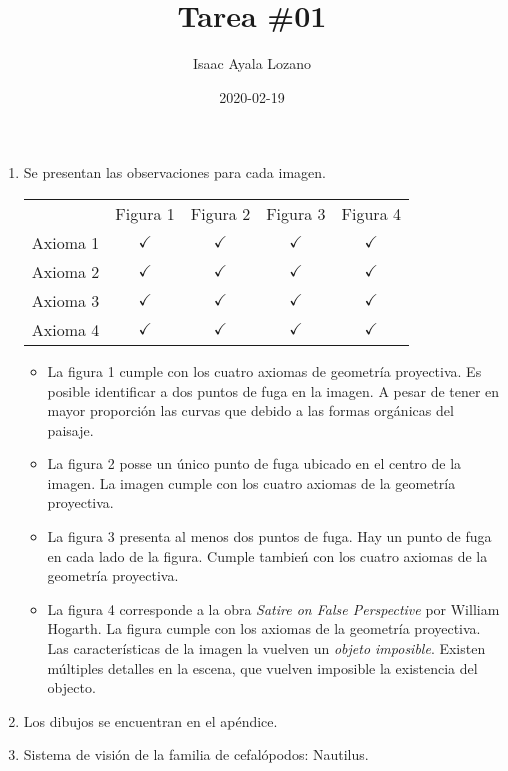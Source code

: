 \documentclass[a4paper,12pt]{article}
\title{Tarea \#01}
\author{Isaac Ayala Lozano}
\date{2020-02-19}
\begin{document}
\maketitle

\begin{enumerate}
 \item Se presentan las observaciones para cada imagen.

 \begin{table}[htb!]
  \begin{center}
\begin{tabular}{lcccc}
 & Figura 1 & Figura 2 & Figura 3 & Figura 4\\
Axioma 1 & $\checkmark$ & $\checkmark$ & $\checkmark$ & $\checkmark$\\
Axioma 2 & $\checkmark$ & $\checkmark$ & $\checkmark$ & $\checkmark$\\
Axioma 3 & $\checkmark$ & $\checkmark$ & $\checkmark$ & $\checkmark$\\
Axioma 4 & $\checkmark$ & $\checkmark$ & $\checkmark$ & $\checkmark$
  \end{tabular}
  \end{center}
 \end{table}


    \begin{itemize}
     \item La figura 1 cumple con los cuatro axiomas de geometría proyectiva.
     Es posible identificar a dos puntos de fuga en la imagen.
     A pesar de tener en mayor proporción las curvas que debido a las formas orgánicas del paisaje.
     \item La figura 2 posse un único punto de fuga ubicado en el centro de la imagen.
     La imagen cumple con los cuatro axiomas de la geometría proyectiva.
     \item La figura 3 presenta al menos dos puntos de fuga. Hay un punto de fuga en cada lado de la figura.
     Cumple tambień con los cuatro axiomas de la geometría proyectiva.
     \item La figura 4 corresponde a la obra \emph{Satire on False Perspective} por William Hogarth.
     La figura cumple con los axiomas de la geometría proyectiva.
     Las características de la imagen la vuelven un \emph{objeto imposible}.
     Existen múltiples detalles en la escena, que vuelven imposible la existencia del objecto.
    \end{itemize}
 \item Los dibujos se encuentran en el apéndice.
 \item Sistema de visión de la familia de cefalópodos: Nautilus.
\end{enumerate}
\end{document}
